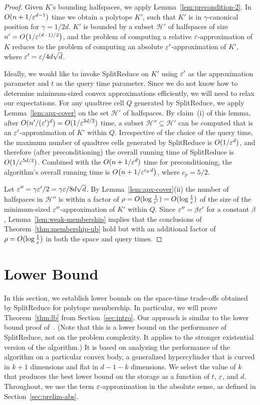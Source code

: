 \documentclass[11pt]{article}   \usepackage[letterpaper,hmargin=2.1cm,vmargin=3cm]{geometry}
\newcommand{\inv}[1]{\frac{1}{#1}}
\newcommand{\alg}{\textrm{SplitReduce}}
\renewcommand{\P}{\kern+1pt}    \newcommand{\N}{\kern-2pt}      \newcommand{\NN}{\kern-4pt}     \newcommand{\polar}[1]{\mathrm{polar}(#1)}            \newcommand{\polarX}[2]{\mathrm{polar}_{#1}(#2)}
\begin{document}
\begin{proof}
Given $K$'s bounding halfspaces, we apply Lemma~\ref{lem:precondition-2}. In $O(n + 1/\varepsilon^{d-1})$ time we obtain a polytope $K'$, such that $K'$ is in $\gamma$-canonical position for $\gamma = 1/2 d$. $K'$ is bounded by a subset $\mathcal{H}'$ of halfspaces of size $n' = O\big(1/\varepsilon^{(d-1)/2}\big)$, and the problem of computing a relative $\varepsilon$-approximation of $K$ reduces to the problem of computing an absolute $\varepsilon'$-approximation of $K'$, where $\varepsilon' = \varepsilon/4 d \sqrt{d}$. 

Ideally, we would like to invoke {\alg} on $K'$ using $\varepsilon'$ as the approximation parameter and $t$ as the query time parameter. Since we do not know how to determine minimum-sized convex approximations efficiently, we will need to relax our expectations. For any quadtree cell $Q$ generated by {\alg}, we apply Lemma~\ref{lem:apx-cover} on the set $\mathcal{H}'$ of halfspaces. By claim~(i) of this lemma, after $O(n'/(\varepsilon')^{d}) = O(1/\varepsilon^{3 d/2})$ time, a subset $\mathcal{H}'' \subseteq \mathcal{H}'$ can be computed that is an $\varepsilon'$-approximation of $K'$ within $Q$. Irrespective of the choice of the query time, the maximum number of quadtree cells generated by {\alg} is $O(1/\varepsilon^d)$, and therefore (after preconditioning) the overall running time of {\alg} is $O(1/\varepsilon^{5 d/2})$. Combined with the $O(n + 1/\varepsilon^d)$ time for preconditioning, the algorithm's overall running time is $O\big(n + 1/\eps^{c_p \P d}\big)$, where $c_p = 5/2$.

Let $\varepsilon'' = \gamma\varepsilon'/2 = \gamma\varepsilon/8 d \sqrt{d}$. By Lemma~\ref{lem:apx-cover}(ii) the number of halfspaces in $\mathcal{H}''$ is within a factor of $\rho = O(\log \inv{\eps'}) = O(\log \inv{\eps})$ of the size of the minimum-sized $\varepsilon''$-approximation of $K'$ within $Q$. Since $\varepsilon'' = \beta \varepsilon'$ for a constant $\beta$, Lemma~\ref{lem:weak-membership} implies that the conclusions of Theorem~\ref{thm:membership-ub} hold but with an additional factor of $\rho = O(\log \inv{\eps})$ in both the space and query times.
\end{proof}

\section{Lower Bound} \label{sec:lb}


In this section, we establish lower bounds on the space-time trade-offs obtained by {\alg} for polytope membership. In particular, we will prove Theorem~\ref{thm:lb} from Section~\ref{sec:intro}. Our approach is similar to the lower bound proof of~\cite{AVD-JACM}. (Note that this is a lower bound on the performance of {\alg}, not on the problem complexity. It applies to the stronger existential version of the algorithm.) It is based on analyzing the performance of the algorithm on a particular convex body, a generalized hypercylinder that is curved in $k+1$ dimensions and flat in $d-1-k$ dimensions. We select the value of $k$ that produces the best lower bound on the storage as a function of $t$, $\varepsilon$, and $d$. Throughout, we use the term $\varepsilon$-approximation in the absolute sense, as defined in Section~\ref{sec:prelim-abs}. 
\end{document}

